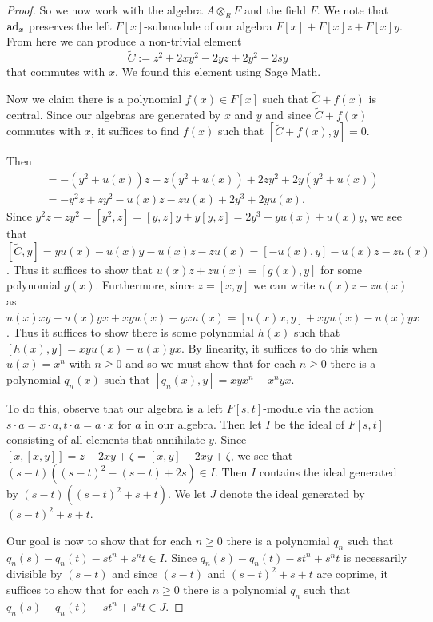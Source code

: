 \documentclass[a4paper,11pt,twoside,notitlepage,reqno]{amsart}
\theoremstyle{plain}
\numberwithin{thm}{section}
\theoremstyle{definition}
\begin{document}
\begin{proof}
So we now work with the algebra $A\otimes_R F$ and the field $F$.  We note that ${\rm ad}_x$ preserves the left $F[x]$-submodule of our algebra $F[x]+F[x]z+F[x]y$.  From here we can produce a non-trivial element $$\tilde{C}:=z^2+ 2xy^2 - 2yz+  2y^2 -2s y$$ that commutes with $x$. We found this element using Sage Math.

Now we claim there is a polynomial $f(x)\in F[x]$ such that $\tilde{C}+f(x)$ is central.  Since our algebras are generated by $x$ and $y$ and since $\tilde{C}+f(x)$ commutes with $x$, it suffices to find $f(x)$ such that $[\tilde{C}+f(x),y]=0$.

Then \begin{align*}
[\tilde{C},y] &= -(y^2 + u(x)) z - z(y^2+u(x)) +2zy^2 + 2y(y^2+u(x)) \\
&=-y^2z+zy^2 -u(x)z - zu(x) +2y^3 +2y u(x).
\end{align*}
Since $y^2z-zy^2=[y^2,z] = [y,z] y + y[y,z] = 2y^3 + y u(x)+u(x)y$, we see that 
$[\tilde{C},y] = yu(x)-u(x)y -u(x)z - zu(x) = [-u(x),y] - u(x) z - zu(x)$. 
 Thus it suffices to show that $u(x)z+zu(x) = [g(x),y]$ for some polynomial $g(x)$.  Furthermore, since $z=[x,y]$ we can write $u(x)z+zu(x)$ as
 $u(x) xy - u(x)yx + xy u(x) - y x u(x) = [u(x)x ,y] + x yu(x)-  u(x)yx$.
 Thus it suffices to show there is some polynomial $h(x)$ such that $[h(x),y] = x y u(x)- u(x)y x$.  By linearity, it suffices to do this when $u(x)=x^n$ with $n\ge 0$ and so we must show that for each $n\ge 0$ there is a polynomial $q_n(x)$ such that $[q_n(x),y] = xyx^n- x^n yx$.


To do this, observe that our algebra is a left $F[s,t]$-module via the action $s\cdot a = x \cdot a, t\cdot a= a\cdot x$ for $a$ in our algebra.  Then let $I$ be the ideal of $F[s,t]$ consisting of all elements that annihilate $y$.  Since 
$[x,[x,y]] = z- 2xy+\zeta = [x,y]- 2xy+\zeta$, we see that $(s-t)((s-t)^2 -(s-t) + 2s)\in I$.  Then $I$ contains the ideal generated by $(s-t)((s-t)^2+s+t)$.
We let $J$ denote the ideal generated by $(s-t)^2+s+t$.

Our goal is now to show that for each $n\ge 0$ there is a polynomial $q_n$ such that
$q_n(s)-q_n(t) - st^n + s^nt\in I$.  Since $q_n(s)-q_n(t)-st^n+s^n t$ is necessarily divisible by $(s-t)$ and since $(s-t)$ and $(s-t)^2+s+t$ are coprime, it suffices to show that for each $n\ge 0$ there is a polynomial $q_n$ such that
$q_n(s)-q_n(t) - st^n + s^nt\in J$. 


\end{proof}
\end{document}
